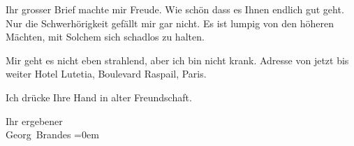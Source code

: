 \pstart
           Ihr grosser Brief machte mir Freude. Wie schön dass es Ihnen endlich gut geht. Nur
               die Schwerhörigkeit gefällt mir gar nicht. Es ist lumpig von den höheren Mächten, mit
               Solchem sich schadlos zu halten.\pend
           
\pstart
           Mir geht es nicht eben strahlend, aber ich bin nicht krank. Adresse von jetzt bis
               weiter Hotel Lutetia, Boulevard Raspail, Paris.\pend
           
\pstart
           Ich drücke Ihre Hand in alter Freundschaft.\pend
           
\pstart
           Ihr ergebener{\\[\baselineskip]}\spacefill\mbox{Georg Brandes}\pend
           \leftskip=0em{}\endnumbering{}  
      